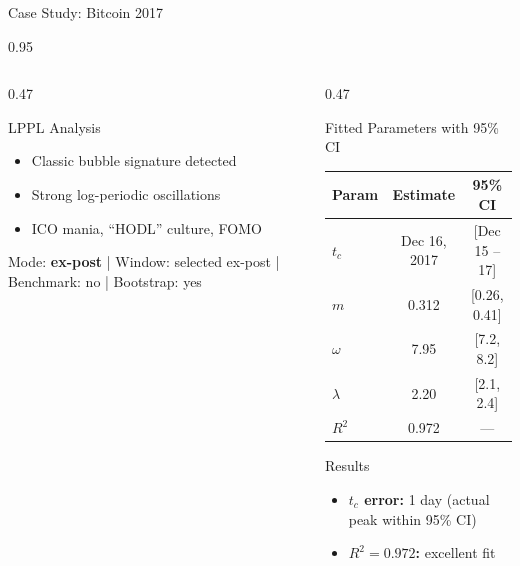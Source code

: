 \documentclass[9pt, aspectratio=169, t]{beamer}
\begin{document}
\begin{frame}{Case Study: Bitcoin 2017}
\begin{cminipage}{0.95\textwidth}
{\begin{columns}[T]
\begin{column}{0.47\textwidth}
            \begin{exampleblock}{LPPL Analysis}
                \begin{itemize}\setlength{\itemsep}{0pt}
                    \item Classic bubble signature detected
                    \item Strong log-periodic oscillations
                    \item ICO mania, ``HODL'' culture, FOMO
                \end{itemize}
            \end{exampleblock}
            \vspace{-2mm}
            {\scriptsize\textcolor{MediumGray}{Mode: \textbf{ex-post} | Window: selected ex-post | Benchmark: no | Bootstrap: yes}}
        \end{column}
        \begin{column}{0.47\textwidth}
            \begin{alertblock}{Fitted Parameters with 95\% CI}
                \begin{center}
                    \begin{tabular}{lcc}
                        \toprule
                        \textbf{Param} & \textbf{Estimate} & \textbf{95\% CI} \\
                        \midrule
                        $t_c$ & Dec 16, 2017 & [Dec 15 -- 17] \\
                        $m$ & 0.312 & [0.26, 0.41] \\
                        $\omega$ & 7.95 & [7.2, 8.2] \\
                        $\lambda$ & 2.20 & [2.1, 2.4] \\
                        $R^2$ & 0.972 & --- \\
                        \bottomrule
                    \end{tabular}
                \end{center}
            \end{alertblock}

            \begin{exampleblock}{Results}
                \begin{itemize}\setlength{\itemsep}{0pt}
                    \item \textbf{$t_c$ error:} 1 day (actual peak within 95\% CI)
                    \item \textbf{$R^2 = 0.972$:} excellent fit
                \end{itemize}
            \end{exampleblock}
        \end{column}
    \end{columns}
    }
    \end{cminipage}
\end{frame}
\end{document}
